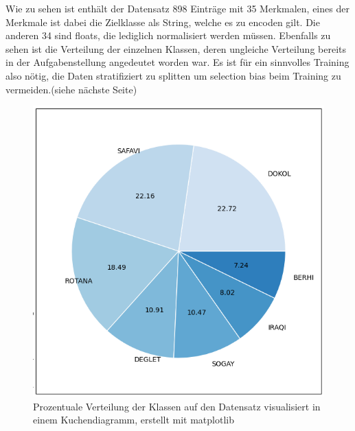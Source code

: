 \documentclass[letterpaper,10pt]{article}
\begin{document}
    Wie zu sehen ist enthält der Datensatz 898 Einträge mit 35 Merkmalen, eines der Merkmale ist dabei die Zielklasse als String, welche es zu encoden gilt. Die anderen 34 sind floats, die lediglich normalisiert werden müssen. Ebenfalls zu sehen ist die Verteilung der einzelnen Klassen, deren ungleiche Verteilung bereits in der Aufgabenstellung angedeutet worden war. Es ist für ein sinnvolles Training also nötig, die Daten stratifiziert zu splitten um selection bias beim Training zu vermeiden.(siehe nächste Seite)
    \begin{figure} [p]
        \centering
        \includegraphics[width=\textwidth]{PieChart_ClassOverview.png}
        \caption{Prozentuale Verteilung der Klassen auf den Datensatz visualisiert in einem Kuchendiagramm, erstellt mit matplotlib \cite{Hunter.2007}}
    \end{figure}
        
\newpage
\end{document}
